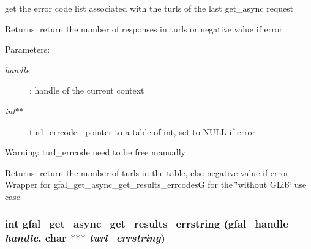 get the error code list associated with the turls of the last get\_\-async request \begin{Desc}
\item[Returns:]return the number of responses in turls or negative value if error \end{Desc}
\begin{Desc}
\item[Parameters:]
\begin{description}
\item[{\em handle}]: handle of the current context \item[{\em int$\ast$$\ast$}]turl\_\-errcode : pointer to a table of int, set to NULL if error \end{description}
\end{Desc}
\begin{Desc}
\item[Warning:]turl\_\-errcode need to be free manually \end{Desc}
\begin{Desc}
\item[Returns:]return the number of turls in the table, else negative value if error Wrapper for gfal\_\-get\_\-async\_\-get\_\-results\_\-errcodes\-G for the \char`\"{}without GLib\char`\"{} use case \end{Desc}
\subsubsection{\setlength{\rightskip}{0pt plus 5cm}int gfal\_\-get\_\-async\_\-get\_\-results\_\-errstring (gfal\_\-handle {\em handle}, char $\ast$$\ast$$\ast$ {\em turl\_\-errstring})}\label{gfal__common__interface_8h_ecd7d68b18088ff620d21dbef85862ae}


